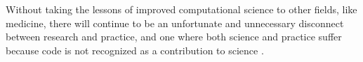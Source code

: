 \documentclass{comjnl}
\begin{document}
\begin{change}
Without taking the lessons of improved computational science to other fields, like medicine, there will continue to be an unfortunate and unnecessary disconnect between research and practice, and one where both science and practice suffer because code is not recognized as a contribution to science \cite{fixit}. 



%
%

\end{change}
\end{document}
